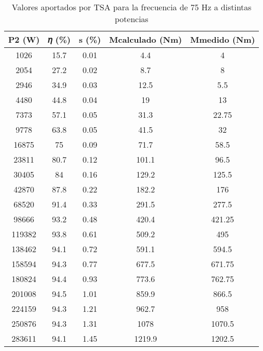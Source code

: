 \documentclass[12pt]{article}
\begin{document}
{\extrarowheight
\renewcommand{\arraystretch}{2.25}
    \begin{table}[H]
    \centering
    \begin{tabular}{ccccc}
    P2 (W) & 𝜂 (\%) & s (\%) & Mcalculado (Nm) & Mmedido (Nm) \\ \hline
    1026   & 15.7    & 0.01   & 4.4             & 4            \\
    2054   & 27.2    & 0.02   & 8.7             & 8            \\
    2946   & 34.9    & 0.03   & 12.5            & 5.5          \\
    4480   & 44.8    & 0.04   & 19              & 13           \\
    7373   & 57.1    & 0.05   & 31.3            & 22.75        \\
    9778   & 63.8    & 0.05   & 41.5            & 32           \\
    16875  & 75      & 0.09   & 71.7            & 58.5         \\
    23811  & 80.7    & 0.12   & 101.1           & 96.5         \\
    30405  & 84      & 0.16   & 129.2           & 125.5        \\
    42870  & 87.8    & 0.22   & 182.2           & 176          \\
    68520  & 91.4    & 0.33   & 291.5           & 277.5        \\
    98666  & 93.2    & 0.48   & 420.4           & 421.25       \\
    119382 & 93.8    & 0.61   & 509.2           & 495          \\
    138462 & 94.1    & 0.72   & 591.1           & 594.5        \\
    158594 & 94.3    & 0.77   & 677.5           & 671.75       \\
    180824 & 94.4    & 0.93   & 773.6           & 762.75       \\
    201008 & 94.5    & 1.01   & 859.9           & 866.5        \\
    224159 & 94.3    & 1.21   & 962.7           & 958          \\
    250876 & 94.3    & 1.31   & 1078            & 1070.5       \\
    283611 & 94.1    & 1.45   & 1219.9          & 1202.5       \\ \hline
    \end{tabular}
    \caption{Valores aportados por TSA para la frecuencia de 75 Hz a distintas potencias}
    \label{tab: valores_iniciales}
    \end{table}}
\end{document}
